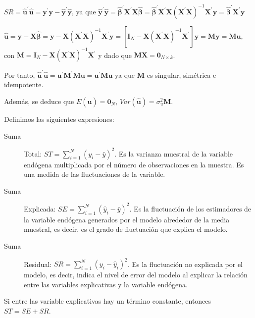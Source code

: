 $SR=\hat{\boldsymbol{u}}^{\prime}\hat{\boldsymbol{u}}=\boldsymbol{y}^{\prime}\boldsymbol{y}-\hat{\boldsymbol{y}}^{\prime}\hat{\boldsymbol{y}}$,
ya que $\hat{\boldsymbol{y}}^{\prime}\hat{\boldsymbol{y}}=\hat{\boldsymbol{\beta}}^{\prime}\boldsymbol{X}^{\prime}\boldsymbol{X}\hat{\boldsymbol{\beta}}=\hat{\boldsymbol{\beta}}^{\prime}\boldsymbol{X}^{\prime}\boldsymbol{X}\left(\boldsymbol{X}^{\prime}\boldsymbol{X}\right)^{-1}\boldsymbol{X}^{\prime}\boldsymbol{y}=\hat{\boldsymbol{\beta}}^{\prime}\boldsymbol{X}^{\prime}\boldsymbol{y}$



$\hat{\boldsymbol{u}}=\boldsymbol{y}-\boldsymbol{X}\hat{\boldsymbol{\beta}}=\boldsymbol{y}-\boldsymbol{X}\left(\boldsymbol{X}^{\prime}\boldsymbol{X}\right)^{-1}\boldsymbol{X}^{\prime}\boldsymbol{y}=\left[\boldsymbol{I}_{N}-\boldsymbol{X}\left(\boldsymbol{X}^{\prime}\boldsymbol{X}\right)^{-1}\boldsymbol{X}^{\prime}\right]\boldsymbol{y}=\boldsymbol{M}\boldsymbol{y}=\boldsymbol{M}\boldsymbol{u}$,
con $\boldsymbol{M}=\boldsymbol{I}_{N}-\boldsymbol{X}\left(\boldsymbol{X}^{\prime}\boldsymbol{X}\right)^{-1}\boldsymbol{X}^{\prime}$
y dado que $\boldsymbol{MX}=\boldsymbol{0}_{N\times k}$.

Por tanto, $\hat{\boldsymbol{u}}^{\prime}\hat{\boldsymbol{u}}=\boldsymbol{u}^{\prime}\boldsymbol{M}^{\prime}\boldsymbol{M}\boldsymbol{u}=\boldsymbol{u}^{\prime}\boldsymbol{M}\boldsymbol{u}$
ya que $\boldsymbol{M}$ es singular, sim\'etrica e idempotente.

Adem\'as, se deduce que $E\left(\hat{\boldsymbol{u}}\right)=\boldsymbol{0}_{N}$,
$Var\left(\hat{\boldsymbol{u}}\right)=\sigma_{u}^{2}\boldsymbol{M}$.



Definimos las siguientes expresiones:
\begin{description}
\item [{Suma}] Total: $ST=\sum_{i=1}^{N}\left(y_{i}-\bar{y}\right)^{2}$.
Es la varianza muestral de la variable end\'ogena multiplicada por el
n\'umero de observaciones en la muestra. Es una medida de las fluctuaciones
de la variable.
\item [{Suma}] Explicada: $SE=\sum_{i=1}^{N}\left(\hat{y}_{i}-\bar{y}\right)^{2}$.
Es la fluctuaci\'on de los estimadores de la variable end\'ogena generados
por el modelo alrededor de la media muestral, es decir, es el grado
de fluctuaci\'on que explica el modelo.
\item [{Suma}] Residual: $SR=\sum_{i=1}^{N}\left(y_{i}-\hat{y}_{i}\right)^{2}$.
Es la fluctuaci\'on no explicada por el modelo, es decir, indica el
nivel de error del modelo al explicar la relaci\'on entre las variables
explicativas y la variable end\'ogena.
\end{description}
Si entre las variable explicativas hay un t\'ermino constante, entonces
$ST=SE+SR$.


